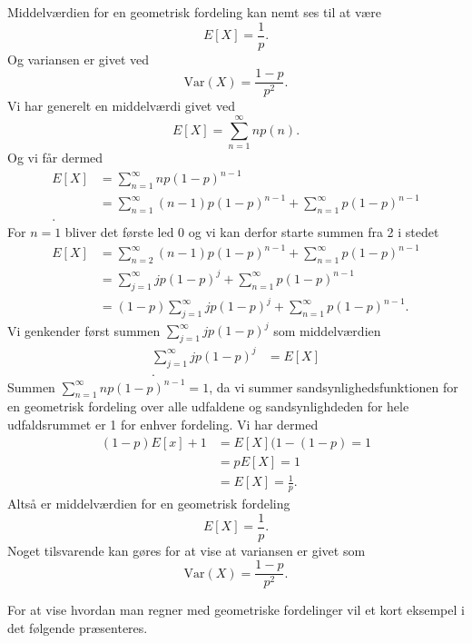 \begin{sæt}
  Middelværdien for en geometrisk fordeling kan nemt ses til at være
  \[ 
    E[X] = \frac{1}{p}
  .\]
  Og variansen er givet ved
  \[ 
    \mathrm{Var}(X) = \frac{1-p}{p^2}
  .\]
  \tcblower
  Vi har generelt en middelværdi givet ved
  \[ 
    E[X] = \sum_{n = 1}^{\infty} n p(n)
  .\]
  Og vi får dermed
  \begin{align*}
    E[X] &= \sum_{n = 1}^{\infty} n p(1-p)^{n-1} \\ 
    &= \sum_{n = 1}^{\infty} (n-1) p(1-p)^{n-1} + \sum_{n = 1}^{\infty}  p(1-p)^{n-1}  \\
  .\end{align*}
  For $n = 1$ bliver det første led 0 og vi kan derfor starte summen fra 2 i stedet
  \begin{align*}
    E[X] &= \sum_{n = 2}^{\infty} (n-1) p(1-p)^{n-1} + \sum_{n = 1}^{\infty} p(1-p)^{n-1} \\
    &= \sum_{j = 1}^{\infty} j p(1-p)^{j} + \sum_{n = 1}^{\infty} p(1-p)^{n-1} \\
    &= (1-p) \sum_{j = 1}^{\infty} j p(1-p)^{j} + \sum_{n = 1}^{\infty} p(1-p)^{n-1}
  .\end{align*}
  Vi genkender først summen $\sum_{j = 1}^{\infty} j p(1-p)^{j}$ som middelværdien
  \begin{align*}
    \sum_{j = 1}^{\infty} jp(1-p)^{j} &= E[X] \\
  .\end{align*}
  Summen $\sum_{n = 1}^{\infty} n p (1-p)^{n-1} = 1$, da vi summer sandsynlighedsfunktionen for en geometrisk fordeling over alle udfaldene og sandsynlighdeden for hele udfaldsrummet er 1 for enhver fordeling. Vi har dermed
  \begin{align*}
    (1-p) E[x] + 1 & = E[X] (1- (1-p) = 1 \\
                   &= pE[X] = 1 \\
                   &= E[X] = \frac{1}{p}
  .\end{align*}
  Altså er middelværdien for en geometrisk fordeling
  \[ 
    E[X] = \frac{1}{p}
  .\]
  \vspace{12pt}
  Noget tilsvarende kan gøres for at vise at variansen er givet som
  \[ 
    \mathrm{Var}(X) = \frac{1-p}{p^2}
  .\]
\end{sæt}

For at vise hvordan man regner med geometriske fordelinger vil et kort eksempel i det følgende præsenteres.

